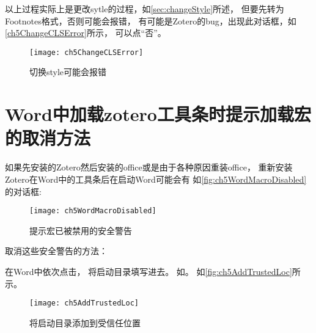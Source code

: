 \documentclass[cn,11pt,chinese]{elegantbook}
\begin{document}
	    			
					以上过程实际上是更改sytle的过程，如\cref{sec:changeStyle}所述，
					但要先转为Footnotes格式，否则可能会报错，
					有可能是Zotero的bug，出现此对话框，如\autoref{ch5ChangeCLSError}所示，
					可以点“否”。
	    			\begin{figure}[ht]
	    				\centering
	    				\texttt{[image: ch5ChangeCLSError]}
	    				\caption{切换style可能会报错}
	    				\label{ch5ChangeCLSError}
	    			\end{figure}
    			
	    \section{Word中加载zotero工具条时提示加载宏的取消方法}\label{sec:load_mac}
			如果先安装的Zotero然后安装的office或是由于各种原因重装office，
			重新安装Zotero在Word中的工具条后在启动Word可能会有
			如\autoref{fig:ch5WordMacroDisabled}的对话框:
	    	\begin{figure}[htbp]
	    		\centering
	    		\texttt{[image: ch5WordMacroDisabled]}
	    		\caption{提示宏已被禁用的安全警告}
	    		\label{fig:ch5WordMacroDisabled}
	    	\end{figure}
	       	
	      取消这些安全警告的方法：
    	
		在Word中依次点击，
		将启动目录填写进去。    	
		如。
		如\autoref{fig:ch5AddTrustedLoc}所示。
	    		\begin{figure}[ht]
					\centering
					\texttt{[image: ch5AddTrustedLoc]}
					\caption{将启动目录添加到受信任位置}
					\label{fig:ch5AddTrustedLoc}
	    		\end{figure}
		
\end{document}

